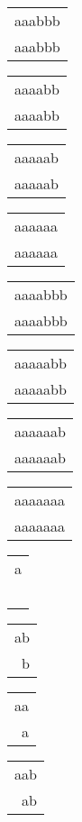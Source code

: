 \begin{description}
\begin{tabular}{|l|}
aaabbb \\
aaabbb \\
\hline
\end{tabular} 
\begin{tabular}{|l|} \hline
aaaabb \\
aaaabb \\
\hline
\end{tabular} 
\begin{tabular}{|l|} \hline
aaaaab \\
aaaaab \\
\hline
\end{tabular} 
\begin{tabular}{|l|} \hline
aaaaaa \\
aaaaaa \\
\hline
\end{tabular} 
\begin{tabular}{|l|} \hline
aaaabbb \\
aaaabbb \\
\hline
\end{tabular} 
\begin{tabular}{|l|} \hline
aaaaabb \\
aaaaabb \\
\hline
\end{tabular} 
\begin{tabular}{|l|} \hline
aaaaaab \\
aaaaaab \\
\hline
\end{tabular} 
\begin{tabular}{|l|} \hline
aaaaaaa \\
aaaaaaa \\
\hline
\end{tabular} 
\begin{tabular}{|l|} \hline
a \\
\  \\
\hline
\end{tabular} 
\begin{tabular}{|l|} \hline
ab \\
\ b \\
\hline
\end{tabular} 
\begin{tabular}{|l|} \hline
aa \\
\ a \\
\hline
\end{tabular} 
\begin{tabular}{|l|} \hline
aab \\
\ ab \\

\end{tabular}
\end{description}
